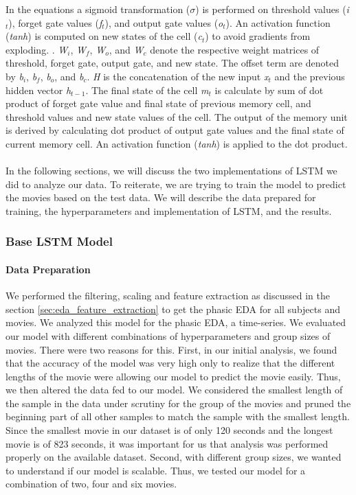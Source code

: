 In the equations a sigmoid transformation ($\sigma$) is performed on threshold values (\textit{i$_{t}$}), forget gate values (\textit{f$_{t}$}), and output gate values (\textit{o$_{t}$}). An activation function (\textit{tanh}) is computed on new states of the cell (\textit{c$_{t}$}) to avoid gradients from exploding. . \textit{W$_{i}$}, \textit{W$_{f}$}, \textit{W$_{o}$}, and \textit{W$_{c}$} denote the respective weight matrices of threshold, forget gate, output gate, and new state. The offset term are denoted by \textit{b$_{i}$}, \textit{b$_{f}$}, \textit{b$_{o}$}, and \textit{b$_{c}$}.  \textit{H} is the concatenation of the new input \textit{x$_{t}$} and the previous hidden vector \textit{h$_{t-1}$}. The final state of the cell \textit{m$_{t}$} is calculate by sum of dot product of forget gate value and final state of previous memory cell, and threshold values and new state values of the cell. The output of the memory unit is derived by calculating dot product of output gate values and the final state of current memory cell. An activation function (\textit{tanh}) is applied to the dot product. 

\paragraph{} In the following sections, we will discuss the two implementations of LSTM we did to analyze our data. To reiterate, we are trying to train the model to predict the movies based on the test data. We will describe the data prepared for training, the hyperparameters and implementation of LSTM, and the results.

\subsubsection{Base LSTM Model}
\label{sec:lstm_base_model}
\paragraph{Data Preparation}

We performed the filtering, scaling and feature extraction as discussed in the section \ref{sec:eda_feature_extraction} to get the phasic EDA for all subjects and movies. We analyzed this model for the phasic EDA, a time-series. We evaluated our model with different combinations of hyperparameters and group sizes of movies. There were two reasons for this. First, in our initial analysis, we found that the accuracy of the model was very high only to realize that the different lengths of the movie were allowing our model to predict the movie easily. Thus, we then altered the data fed to our model. We considered the smallest length of the sample in the data under scrutiny for the group of the movies and pruned the beginning part of all other samples to match the sample with the smallest length. Since the smallest movie in our dataset is of only 120 seconds and the longest movie is of 823 seconds, it was important for us that analysis was performed properly on the available dataset. Second, with different group sizes, we wanted to understand if our model is scalable. Thus, we tested our model for a combination of two, four and six movies. 

